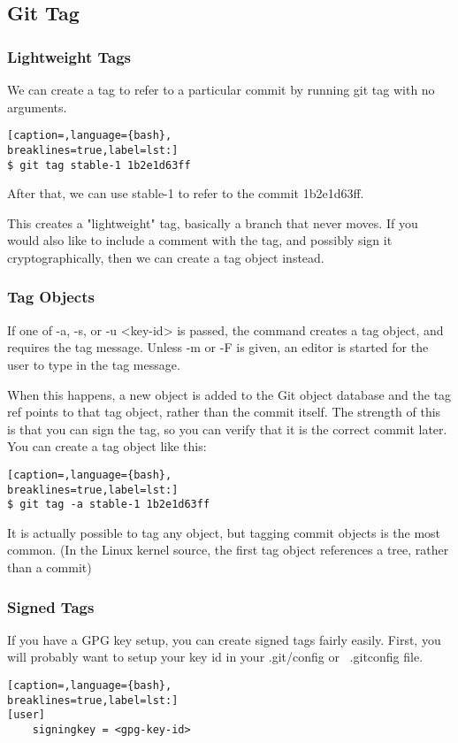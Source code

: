 \subsection{Git Tag}
\subsubsection{Lightweight Tags}
We can create a tag to refer to a particular commit by running git tag with no
arguments.
\lstset{basicstyle=\scriptsize, numbers=none, captionpos=b, tabsize=4}
\begin{lstlisting}[caption=,language={bash},
breaklines=true,label=lst:]
$ git tag stable-1 1b2e1d63ff
\end{lstlisting}

After that, we can use stable-1 to refer to the commit 1b2e1d63ff.

This creates a "lightweight" tag, basically a branch that never moves. If you
would also like to include a comment with the tag, and possibly sign it
cryptographically, then we can create a tag object instead.

\subsubsection{Tag Objects}
If one of -a, -s, or -u <key-id> is passed, the command creates a tag object,
and requires the tag message. Unless -m or -F is given, an editor is started
for the user to type in the tag message.

When this happens, a new object is added to the Git object database and the tag
ref points to that tag object, rather than the commit itself. The strength of
this is that you can sign the tag, so you can verify that it is the correct
commit later. You can create a tag object like this:
\lstset{basicstyle=\scriptsize, numbers=none, captionpos=b, tabsize=4}
\begin{lstlisting}[caption=,language={bash},
breaklines=true,label=lst:]
$ git tag -a stable-1 1b2e1d63ff
\end{lstlisting}

It is actually possible to tag any object, but tagging commit objects is the
most common. (In the Linux kernel source, the first tag object references a
tree, rather than a commit)

\subsubsection{Signed Tags}
If you have a GPG key setup, you can create signed tags fairly easily. First,
you will probably want to setup your key id in your .git/config or ~.gitconfig
file.
\lstset{basicstyle=\scriptsize, numbers=none, captionpos=b, tabsize=4}
\begin{lstlisting}[caption=,language={bash},
breaklines=true,label=lst:]
[user]
    signingkey = <gpg-key-id>
\end{lstlisting}


